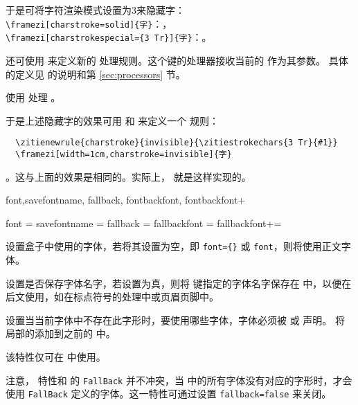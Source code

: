 \documentclass{ctxdoc}
\begin{document}
于是可将字符渲染模式设置为3来隐藏字：\\
\verb|\framezi[charstroke=solid]{字}|：， \\
\verb|\framezi[charstrokespecial={3 Tr}]{字}|：。

还可使用  来定义新的  处理规则。这个键的处理器接收当前的  作为其参数。
具体的定义见  的说明和第 \ref{sec:processors} 节。

 使用  处理 。
  
于是上述隐藏字的效果可用  和  来定义一个  规则：
\begin{verbatim}
  \zitienewrule{charstroke}{invisible}{\zitiestrokechars{3 Tr}{#1}}
  \framezi[width=1cm,charstroke=invisible]{字}
\end{verbatim}
  。这与上面的效果是相同的。实际上， 就是这样实现的。

\begin{function}{
  font,savefontname,
  fallback,
  fontbackfont,
  fontbackfont+
}
  \begin{syntax}
    font =  
    savefontname = \TTF {}
    fallback = \TTF {}
    fallbackfont = 
    fallbackfont+= 
  \end{syntax}
   设置盒子中使用的字体，若将其设置为空，即 \verb|font={}| 或 \verb|font|，则将使用正文字体。

   设置是否保存字体名字，若设置为真，则将  键指定的字体名字保存在  中，以便在后文使用，如在标点符号的处理中或页眉页脚中。

   设置当当前字体中不存在此字形时，要使用哪些字体，字体必须被  或  声明。
   将  局部的添加到之前的  中。

  该特性仅可在 \XeTeX{} 中使用。

  注意， 特性和  的 \verb|FallBack| 并不冲突，当  中的所有字体没有对应的字形时，才会使用 \verb|FallBack| 定义的字体。这一特性可通过设置 \verb|fallback=false| 来关闭。
\end{function}
\end{document}
